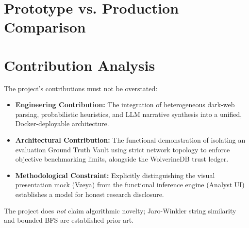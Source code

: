 \section{Prototype vs. Production Comparison}
\label{sec:disc-proto-vs-prod}
\begin{table}[h]
\centering
{}
\caption{Prototype vs. Production Readiness}
\label{tab:proto-vs-prod}
\end{table}

\section{Contribution Analysis}
\label{sec:disc-contributions}
The project's contributions must not be overstated:
\begin{itemize}
    \item \textbf{Engineering Contribution:} The integration of heterogeneous dark-web parsing, probabilistic heuristics, and LLM narrative synthesis into a unified, Docker-deployable architecture.
    \item \textbf{Architectural Contribution:} The functional demonstration of isolating an evaluation Ground Truth Vault using strict network topology to enforce objective benchmarking limits, alongside the WolverineDB trust ledger.
    \item \textbf{Methodological Constraint:} Explicitly distinguishing the visual presentation mock (Vzeya) from the functional inference engine (Analyst UI) establishes a model for honest research disclosure.
\end{itemize}
The project does \textit{not} claim algorithmic novelty; Jaro-Winkler string similarity and bounded BFS are established prior art. 

